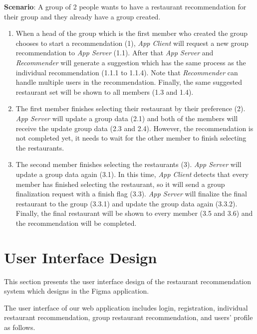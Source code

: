 \documentclass[12pt,oneside,openright,a4paper]{cpe-english-project}
\begin{document}
\newpage
\textbf{Scenario}: A group of 2 people wants to have a restaurant recommendation for their group and they already have a group created.
\begin{enumerate}
\item When a head of the group which is the first member who created the group chooses to start a recommendation (1), \textit{App Client} will request a new group recommendation to \textit{App Server} (1.1). After that \textit{App Server} and \textit{Recommender} will generate a suggestion which has the same process as the individual recommendation (1.1.1 to 1.1.4). Note that \textit{Recommender} can handle multiple users in the recommendation. Finally, the same suggested restaurant set will be shown to all members (1.3 and 1.4).
\item The first member finishes selecting their restaurant by their preference (2). \textit{App Server} will update a group data (2.1) and both of the members will receive the update group data (2.3 and 2.4). However, the recommendation is not completed yet, it needs to wait for the other member to finish selecting the restaurants.
\item The second member finishes selecting the restaurants (3). \textit{App Server} will update a group data again (3.1). In this time, \textit{App Client} detects that every member has finished selecting the restaurant, so it will send a group finalization request with a finish flag (3.3). \textit{App Server} will finalize the final restaurant to the group (3.3.1) and update the group data again (3.3.2). Finally, the final restaurant will be shown to every member (3.5 and 3.6) and the recommendation will be completed.
\end{enumerate}


\section{User Interface Design}
This section presents the user interface design of the restaurant recommendation system which designs in the Figma application.

The user interface of our web application includes login, registration, individual restaurant recommendation, group restaurant recommendation, and users’ profile as follows.

\newpage
\end{document}

